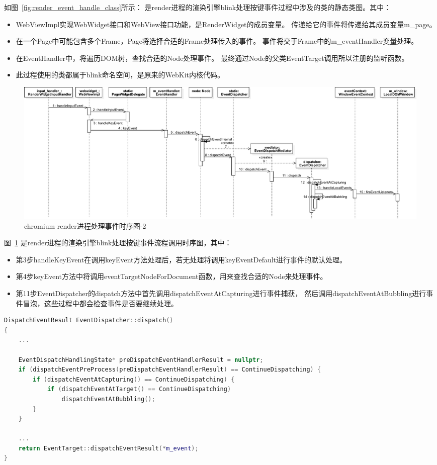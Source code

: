 \documentclass[12pt]{article}
\begin{document}
如图~\ref{fig:render_event_handle_class}所示：
是render进程的渲染引擎blink处理按键事件过程中涉及的类的静态类图。其中：
\begin{itemize}
  \item WebViewImpl实现WebWidget接口和WebView接口功能，是RenderWidget的成员变量。
  传递给它的事件将传递给其成员变量m\_page。
  \item 在一个Page中可能包含多个Frame，Page将选择合适的Frame处理传入的事件。
  事件将交于Frame中的m\_eventHandler变量处理。
  \item 在EventHandler中，将遍历DOM树，查找合适的Node处理事件。
  最终通过Node的父类EventTarget调用所以注册的监听函数。
  \item 此过程使用的类都属于blink命名空间，是原来的WebKit内核代码。
\end{itemize}

\newpage
\begin{figure}[H] 
  \centering 
  \includegraphics[width=\textwidth]{image/render_event_handle_sequence.pdf} 
  \caption{chromium render进程处理事件时序图-2} \label{fig:render_event_handle_sequence} 
\end{figure}

图~\ref{fig:render_event_handle_sequence}
是render进程的渲染引擎blink处理按键事件流程调用时序图，其中：
\begin{itemize}
  \item 第3步handleKeyEvent在调用keyEvent方法处理后，若无处理将调用keyEventDefault进行事件的默认处理。
  \item 第4步keyEvent方法中将调用eventTargetNodeForDocument函数，用来查找合适的Node来处理事件。
  \item 第11步EventDispatcher的dispatch方法中首先调用dispatchEventAtCapturing进行事件捕获，
  然后调用dispatchEventAtBubbling进行事件冒泡，这些过程中都会检查事件是否要继续处理。
\end{itemize}

\begin{spacing}{1.0}
\begin{lstlisting}[language={C++}]
DispatchEventResult EventDispatcher::dispatch()
{
    ...
    
    EventDispatchHandlingState* preDispatchEventHandlerResult = nullptr;
    if (dispatchEventPreProcess(preDispatchEventHandlerResult) == ContinueDispatching) {
        if (dispatchEventAtCapturing() == ContinueDispatching) {
            if (dispatchEventAtTarget() == ContinueDispatching)
                dispatchEventAtBubbling();
        }
    }
    
    ...
    return EventTarget::dispatchEventResult(*m_event);
}
\end{lstlisting}
\end{spacing}
\end{document}
